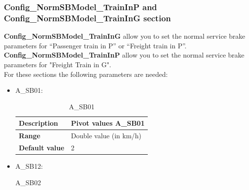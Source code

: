 \subsubsection{Config\_NormSBModel\_TrainInP and Config\_NormSBModel\_TrainInG section}

\textbf{Config\_NormSBModel\_TrainInG} allow you to set the normal service brake parameters for “Passenger train in P” or “Freight train in P”.
\\
\textbf{Config\_NormSBModel\_TrainInP} allow you to set the normal service brake parameters for "Freight Train in G".
\\
For these sections the following parameters are needed:

\begin{itemize}
	
	\item A\_SB01:
	\begin{longtable}{|l|l|}
		\caption{A\_SB01}\\
		\hline
		
		\begin{minipage}[t]{0.22\linewidth} \textbf{Description}	\end{minipage}
		&	\begin{minipage}[t]{0.78\linewidth} Pivot values A\_SB01 \end{minipage} \\
		
		\hline
		
		\begin{minipage}[t]{0.22\linewidth} \textbf{Range} \end{minipage}
		&	\begin{minipage}[t]{0.78\linewidth} Double value (in km/h) \end{minipage} \\
		
		\hline
		
		\begin{minipage}[t]{0.22\linewidth} \textbf{Default value}	\end{minipage}
		&	\begin{minipage}[t]{0.78\linewidth} 2 \end{minipage} \\
		
		\hline
	\end{longtable}
	
	\item A\_SB12:
	\begin{longtable}{|l|l|}
		\caption{A\_SB02}\\
		\hline
		

\end{longtable}
\end{itemize}
